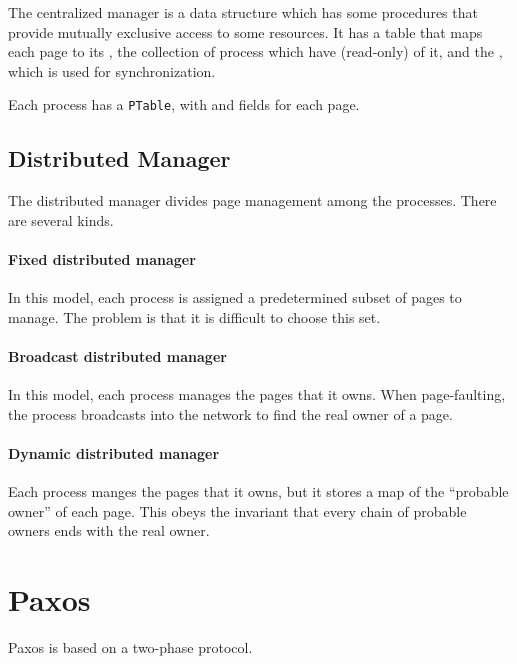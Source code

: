 \documentclass{article}
\begin{document}
The centralized manager is a data structure which has some procedures
that provide mutually exclusive access to some resources. It has a
table that maps each page to its , the collection
of process which have (read-only)  of it, and the
, which is used for synchronization.

Each process has a \texttt{PTable}, with  and 
fields for each page.

\subsection{Distributed Manager}

The distributed manager divides page management among the
processes. There are several kinds.

\paragraph{Fixed distributed manager} In this model, each process is
assigned a predetermined subset of pages to manage. The problem is
that it is difficult to choose this set. 

\paragraph{Broadcast distributed manager} In this model, each process
manages the pages that it owns. When page-faulting, the process
broadcasts into the network to find the real owner of a
page. 

\paragraph{Dynamic distributed manager} Each process manges the pages
that it owns, but it stores a map of the ``probable owner'' of each
page. This obeys the invariant that every chain of probable owners
ends with the real owner.

\section{Paxos}

Paxos is based on a two-phase protocol.
\end{document}
